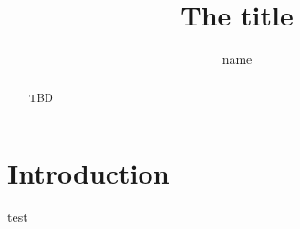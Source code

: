 \documentclass{article}
\title{The title}
\author{name}
\begin{document}
\maketitle

\begin{abstract}
TBD
\end{abstract}

\section{Introduction}

test


% 
% 
\end{document}
